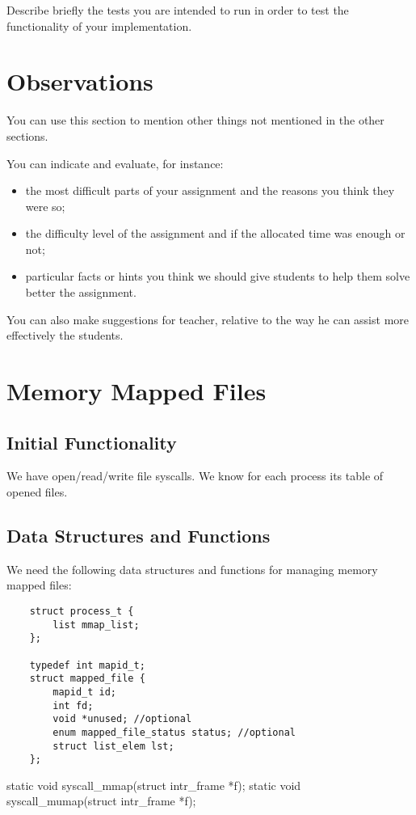 Describe briefly the tests you are intended to run in order to test the functionality of your implementation.

\section{Observations}

You can use this section to mention other things not mentioned in the other sections. 

You can indicate and evaluate, for instance:
\begin{itemize}
	\item the most difficult parts of your assignment and the reasons you think they were so; 
	
	\item the difficulty level of the assignment and if the allocated time was enough or not; 

	\item particular facts or hints you think we should give students to help them solve better the assignment.

\end{itemize}

You can also make suggestions for teacher, relative to the way he can assist more effectively the students.

\section{Memory Mapped Files}
\subsection{Initial Functionality}

We have open/read/write file syscalls. We know for each process its table of opened files.


\subsection{Data Structures and Functions}

We need the following data structures and functions for managing memory mapped files: 

\begin{lstlisting}
	struct process_t {
		list mmap_list;
	};

	typedef int mapid_t;
	struct mapped_file {
		mapid_t id;
		int fd;
		void *unused; //optional
		enum mapped_file_status status; //optional
		struct list_elem lst;
	};	
\end{lstlisting}
	static void syscall_mmap(struct intr_frame *f);
	static void syscall_mumap(struct intr_frame *f);
	


